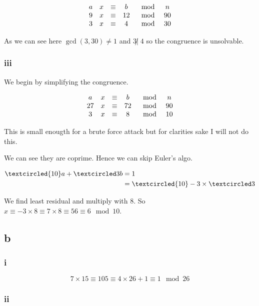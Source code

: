 \documentclass{article}
\begin{document}
$$\begin{matrix}
		a & x & \equiv & b  & \mod & n  \\
		9 & x & \equiv & 12 & \mod & 90 \\
		3 & x & \equiv & 4  & \mod & 30
	\end{matrix}$$

As we can see here $\gcd (3,30) \ne 1$ and $3 \not|\;4$ so the congruence is unsolvable.

\subsubsection{iii}


We begin by simplifying the congruence.

$$\begin{matrix}
		a  & x & \equiv & b  & \mod & n  \\
		27 & x & \equiv & 72 & \mod & 90 \\
		3  & x & \equiv & 8  & \mod & 10 \\
	\end{matrix}$$

This is small enougth for a brute force attack but for clarities sake I will not do this.

We can see they are coprime. Hence we can skip Euler's algo.

\begin{align*}
	\textcircled{10}a + \textcircled 3b & = 1                                           \\
	                                    & = \textcircled {10} - 3 \times \textcircled 3
\end{align*}

We find least residual and multiply with $8$. So $x \equiv -3 \times 8 \equiv 7 \times 8 \equiv 56 \equiv 6 \mod 10$.

\subsection{b}

\subsubsection{i}

$$7 \times 15 \equiv 105 \equiv 4 \times 26 + 1 \equiv 1 \mod 26$$

\subsubsection{ii}
\end{document}
